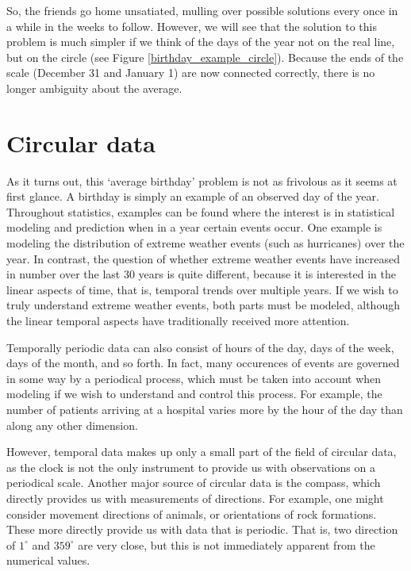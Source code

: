 \documentclass[12pt, a4paper]{book}\usepackage[]{graphicx}\usepackage[]{color}
\begin{document}
So, the friends go home unsatiated, mulling over possible solutions every once in a while in the weeks to follow. However, we will see that the solution to this problem is much simpler if we think of the days of the year not on the real line, but on the circle (see Figure \ref{birthday_example_circle}). Because the ends of the scale (December 31 and January 1) are now connected correctly, there is no longer ambiguity about the average.


\section{Circular data}

As it turns out, this `average birthday' problem is not as frivolous as it seems at first glance.  A birthday is simply an example of an observed day of the year. Throughout statistics, examples can be found where the interest is in statistical modeling and prediction when in a year certain events occur. One example is modeling the distribution of extreme weather events (such as hurricanes) over the year. In contrast, the question of whether extreme weather events have increased in number over the last 30 years is quite different, because it is interested in the linear aspects of time, that is, temporal trends over multiple years. If we wish to truly understand extreme weather events, both parts must be modeled, although the linear temporal aspects have traditionally received more attention.

Temporally periodic data can also consist of hours of the day, days of the week, days of the month, and so forth. In fact, many occurences of events are governed in some way by a periodical process, which must be taken into account when modeling if we wish to understand and control this process. For example, the number of patients arriving at a hospital varies more by the hour of the day than along any other dimension.

However, temporal data makes up only a small part of the field of circular data, as the clock is not the only instrument to provide us with observations on a periodical scale. Another major source of circular data is the compass, which directly provides us with measurements of directions. For example, one might consider movement directions of animals, or orientations of rock formations. These more directly provide us with data that is periodic. That is, two direction of $1^\circ$ and $359^\circ$ are very close, but this is not immediately apparent from the numerical values.
\end{document}
